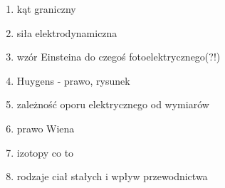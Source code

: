 \documentclass[12pt,a4paper]{article}
\begin{document}
\begin {enumerate}
\item kąt graniczny

\item siła elektrodynamiczna

\item wzór Einsteina do czegoś fotoelektrycznego(?!)

\item Huygens - prawo, rysunek

\item zależność oporu elektrycznego od wymiarów

\item prawo Wiena

\item izotopy co to

\item rodzaje ciał stałych i wpływ przewodnictwa


\end {enumerate}
\end{document}
